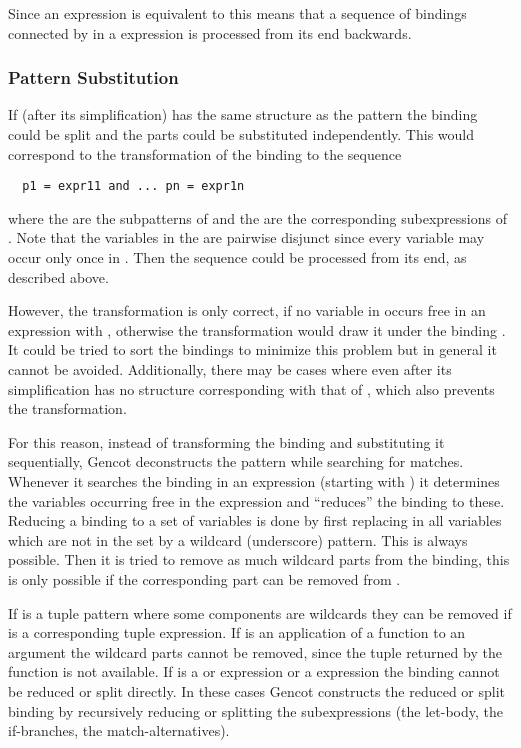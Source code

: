 Since an expression  is equivalent to  this means that a sequence of bindings connected by  in a  expression is processed
from its end backwards.

\subsubsection{Pattern Substitution}

If (after its simplification)  has the same structure as the pattern  the binding could be split and 
the parts could be substituted independently. This would correspond to the transformation of the binding 
to the sequence 
\begin{verbatim}
  p1 = expr11 and ... pn = expr1n
\end{verbatim}
where the  are the subpatterns of  and the  are the corresponding subexpressions of .
Note that the variables in the  are pairwise disjunct since every variable may occur only once in .
Then the sequence could be processed from its end, as described above.

However, the transformation is only correct, if no variable in  occurs free in an expression  with 
, otherwise the transformation would draw it under the binding . It could be tried to sort
the bindings to minimize this problem but in general it cannot be avoided. Additionally, there may be cases where 
even after its simplification has no structure corresponding with that of , which also prevents the transformation.

For this reason, instead of transforming the binding and substituting it sequentially, Gencot deconstructs the pattern while
searching for matches. Whenever it searches the binding  in an expression (starting with ) 
it determines the variables occurring free in the expression and ``reduces'' the binding to these. Reducing a binding to
a set of variables is done by first replacing in  all variables which are not in the set by a wildcard (underscore) 
pattern. This is always possible. Then it is tried to remove as much wildcard parts from the binding, this is only possible if
the corresponding part can be removed from .

If  is a tuple pattern where some components are wildcards
they can be removed if  is a corresponding tuple expression. If  is an application of a function to
an argument the wildcard parts cannot be removed, since the tuple returned by the function is not available.
If  is a  or  expression or a  expression the binding cannot be reduced or split directly.
In these cases Gencot constructs the reduced or split binding by recursively reducing or splitting the subexpressions (the
let-body, the if-branches, the match-alternatives).

